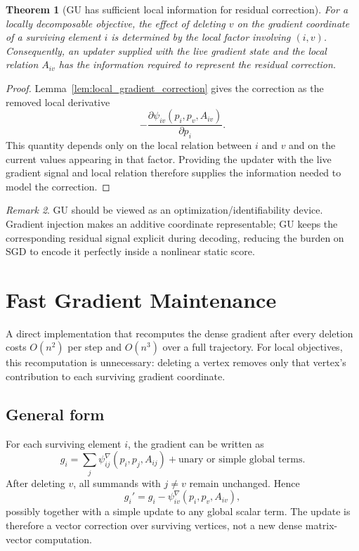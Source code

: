 \documentclass[11pt]{article}
\theoremstyle{plain}
\newtheorem{theorem}{Theorem}[section]
\theoremstyle{remark}
\newtheorem{remark}[theorem]{Remark}
\begin{document}
\begin{theorem}[GU has sufficient local information for residual correction]
  \label{thm:gu_information}
  For a locally decomposable objective, the effect of deleting $v$ on the
  gradient coordinate of a surviving element $i$ is determined by the local
  factor involving $(i,v)$.  Consequently, an updater supplied with the live
  gradient state and the local relation $A_{iv}$ has the information required to
  represent the residual correction.
\end{theorem}

\begin{proof}
  Lemma~\ref{lem:local_gradient_correction} gives the correction as the removed
  local derivative
  \[
    -\frac{\partial \psi_{iv}(p_i,p_v,A_{iv})}{\partial p_i}.
  \]
  This quantity depends only on the local relation between $i$ and $v$ and on
  the current values appearing in that factor.  Providing the updater with the
  live gradient signal and local relation therefore supplies the information
  needed to model the correction.
\end{proof}

\begin{remark}
  GU should be viewed as an optimization/identifiability device.  Gradient
  injection makes an additive coordinate representable; GU keeps the corresponding
  residual signal explicit during decoding, reducing the burden on SGD to encode
  it perfectly inside a nonlinear static score.
\end{remark}

\section{Fast Gradient Maintenance}

A direct implementation that recomputes the dense gradient after every deletion
costs $O(n^2)$ per step and $O(n^3)$ over a full trajectory.  For local
objectives, this recomputation is unnecessary: deleting a vertex removes only
that vertex's contribution to each surviving gradient coordinate.

\subsection*{General form}

For each surviving element $i$, the gradient can be written as
\[
  g_i
  =
  \sum_j \psi^{\nabla}_{ij}(p_i,p_j,A_{ij})
  +
  \text{unary or simple global terms}.
\]
After deleting $v$, all summands with $j\ne v$ remain unchanged.  Hence
\[
  g_i' = g_i - \psi^{\nabla}_{iv}(p_i,p_v,A_{iv}),
\]
possibly together with a simple update to any global scalar term.  The update
is therefore a vector correction over surviving vertices, not a new dense
matrix-vector computation.
\end{document}
